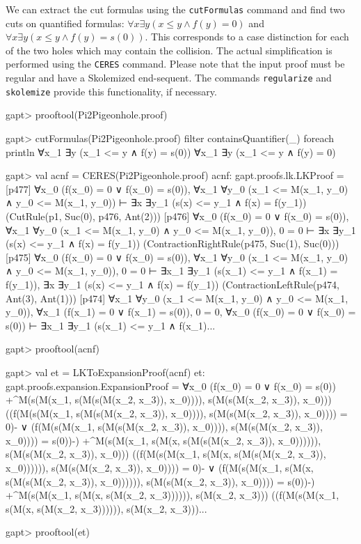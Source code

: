 \documentclass[a4paper,11pt]{book}
\renewcommand{\land}{\wedge}
\begin{document}
We can extract the cut formulas using the \texttt{cutFormulas} command and find two
cuts on quantified formulas: $\forall x \exists y (x \leq y \land f(y) = 0)$
and $\forall x \exists y (x \leq y \land f(y) = s(0))$.
This corresponds to a case distinction for each of the two holes which may contain the collision.
The actual simplification is performed using the \texttt{CERES} command. Please note
that the input proof must be regular and have a Skolemized end-sequent.
The commands \texttt{regularize} and \texttt{skolemize} provide this functionality,
if necessary.

\begin{clilisting}
gapt> prooftool(Pi2Pigeonhole.proof)

gapt> cutFormulas(Pi2Pigeonhole.proof) filter {containsQuantifier(_)} foreach println
∀x_1 ∃y (x_1 <= y ∧ f(y) = s(0))
∀x_1 ∃y (x_1 <= y ∧ f(y) = 0)

gapt> val acnf = CERES(Pi2Pigeonhole.proof)
acnf: gapt.proofs.lk.LKProof =
[p477] ∀x_0 (f(x_0) = 0 ∨ f(x_0) = s(0)),
∀x_1 ∀y_0 (x_1 <= M(x_1, y_0) ∧ y_0 <= M(x_1, y_0))
⊢
∃x ∃y_1 (s(x) <= y_1 ∧ f(x) = f(y_1))    (CutRule(p1, Suc(0), p476, Ant(2)))
[p476] ∀x_0 (f(x_0) = 0 ∨ f(x_0) = s(0)),
∀x_1 ∀y_0 (x_1 <= M(x_1, y_0) ∧ y_0 <= M(x_1, y_0)),
0 = 0
⊢
∃x ∃y_1 (s(x) <= y_1 ∧ f(x) = f(y_1))    (ContractionRightRule(p475, Suc(1), Suc(0)))
[p475] ∀x_0 (f(x_0) = 0 ∨ f(x_0) = s(0)),
∀x_1 ∀y_0 (x_1 <= M(x_1, y_0) ∧ y_0 <= M(x_1, y_0)),
0 = 0
⊢
∃x_1 ∃y_1 (s(x_1) <= y_1 ∧ f(x_1) = f(y_1)),
∃x ∃y_1 (s(x) <= y_1 ∧ f(x) = f(y_1))    (ContractionLeftRule(p474, Ant(3), Ant(1)))
[p474] ∀x_1 ∀y_0 (x_1 <= M(x_1, y_0) ∧ y_0 <= M(x_1, y_0)),
∀x_1 (f(x_1) = 0 ∨ f(x_1) = s(0)),
0 = 0,
∀x_0 (f(x_0) = 0 ∨ f(x_0) = s(0))
⊢
∃x_1 ∃y_1 (s(x_1) <= y_1 ∧ f(x_1)...

gapt> prooftool(acnf)

gapt> val et = LKToExpansionProof(acnf)
et: gapt.proofs.expansion.ExpansionProof =
∀x_0 (f(x_0) = 0 ∨ f(x_0) = s(0))
  +^{M(s(M(x_1, s(M(s(M(x_2, x_3)), x_0)))), s(M(s(M(x_2, x_3)), x_0)))}
    ((f(M(s(M(x_1, s(M(s(M(x_2, x_3)), x_0)))), s(M(s(M(x_2, x_3)), x_0)))) =
          0)- ∨
      (f(M(s(M(x_1, s(M(s(M(x_2, x_3)), x_0)))), s(M(s(M(x_2, x_3)), x_0)))) =
          s(0))-)
  +^{M(s(M(x_1, s(M(x, s(M(s(M(x_2, x_3)), x_0)))))),
        s(M(s(M(x_2, x_3)), x_0)))}
    ((f(M(s(M(x_1, s(M(x, s(M(s(M(x_2, x_3)), x_0)))))),
                  s(M(s(M(x_2, x_3)), x_0)))) =
          0)- ∨
      (f(M(s(M(x_1, s(M(x, s(M(s(M(x_2, x_3)), x_0)))))),
                  s(M(s(M(x_2, x_3)), x_0)))) =
          s(0))-)
  +^{M(s(M(x_1, s(M(x, s(M(x_2, x_3)))))), s(M(x_2, x_3)))}
    ((f(M(s(M(x_1, s(M(x, s(M(x_2, x_3)))))), s(M(x_2, x_3)))...

gapt> prooftool(et)

\end{clilisting}
\end{document}
